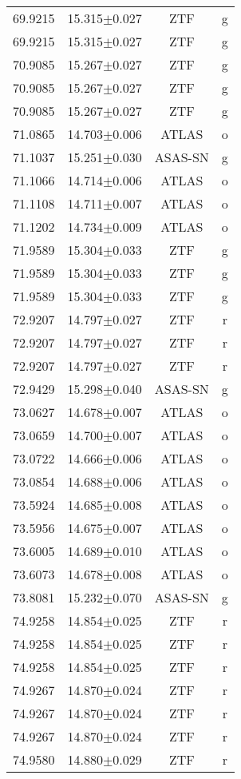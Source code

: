 \begin{table}
\begin{tabular}{cccc}
69.9215 & 15.315$\pm$0.027 & ZTF & g \\
69.9215 & 15.315$\pm$0.027 & ZTF & g \\
70.9085 & 15.267$\pm$0.027 & ZTF & g \\
70.9085 & 15.267$\pm$0.027 & ZTF & g \\
70.9085 & 15.267$\pm$0.027 & ZTF & g \\
71.0865 & 14.703$\pm$0.006 & ATLAS & o \\
71.1037 & 15.251$\pm$0.030 & ASAS-SN & g \\
71.1066 & 14.714$\pm$0.006 & ATLAS & o \\
71.1108 & 14.711$\pm$0.007 & ATLAS & o \\
71.1202 & 14.734$\pm$0.009 & ATLAS & o \\
71.9589 & 15.304$\pm$0.033 & ZTF & g \\
71.9589 & 15.304$\pm$0.033 & ZTF & g \\
71.9589 & 15.304$\pm$0.033 & ZTF & g \\
72.9207 & 14.797$\pm$0.027 & ZTF & r \\
72.9207 & 14.797$\pm$0.027 & ZTF & r \\
72.9207 & 14.797$\pm$0.027 & ZTF & r \\
72.9429 & 15.298$\pm$0.040 & ASAS-SN & g \\
73.0627 & 14.678$\pm$0.007 & ATLAS & o \\
73.0659 & 14.700$\pm$0.007 & ATLAS & o \\
73.0722 & 14.666$\pm$0.006 & ATLAS & o \\
73.0854 & 14.688$\pm$0.006 & ATLAS & o \\
73.5924 & 14.685$\pm$0.008 & ATLAS & o \\
73.5956 & 14.675$\pm$0.007 & ATLAS & o \\
73.6005 & 14.689$\pm$0.010 & ATLAS & o \\
73.6073 & 14.678$\pm$0.008 & ATLAS & o \\
73.8081 & 15.232$\pm$0.070 & ASAS-SN & g \\
74.9258 & 14.854$\pm$0.025 & ZTF & r \\
74.9258 & 14.854$\pm$0.025 & ZTF & r \\
74.9258 & 14.854$\pm$0.025 & ZTF & r \\
74.9267 & 14.870$\pm$0.024 & ZTF & r \\
74.9267 & 14.870$\pm$0.024 & ZTF & r \\
74.9267 & 14.870$\pm$0.024 & ZTF & r \\
74.9580 & 14.880$\pm$0.029 & ZTF & r \\

\end{tabular}
\end{table}
